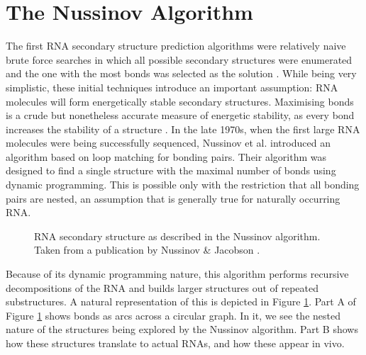 \documentclass[12pt, a4paper]{article}
\begin{document}
\section*{The Nussinov Algorithm} The first RNA secondary structure prediction algorithms were relatively naive brute force searches in which all possible secondary structures were enumerated and the one with
the most bonds was selected as the solution \cite{nussinov1978algorithms}. While being very simplistic,
these initial techniques introduce an important assumption: RNA molecules will
form energetically stable secondary structures. Maximising bonds is a crude but
nonetheless accurate measure of energetic stability, as every bond increases the
stability of a structure \cite{nussinov1978algorithms}. In the late 1970s, when the first large RNA molecules
were being successfully sequenced, Nussinov et al. \cite{nussinov1978algorithms} introduced an algorithm
based on loop matching for bonding pairs. Their algorithm was designed to find a
single structure with the maximal number of bonds using dynamic programming. This is possible only with the restriction that all bonding pairs are nested, an assumption that is generally true for naturally occurring RNA.

\begin{figure}
\begin{center}
\end{center}
\caption{RNA secondary structure as described in the Nussinov algorithm.
Taken from a publication by Nussinov \& Jacobson \cite{nussinov1980fast}.}
\label{figure1}
\end{figure}


Because of its dynamic programming nature, this algorithm performs recursive decompositions of the RNA and builds
larger structures out of repeated substructures. A natural representation of this is
depicted in Figure \ref{figure1}. Part A of Figure \ref{figure1} shows bonds as arcs across a circular
graph. In it, we see the nested nature of the structures being explored by the
Nussinov algorithm. Part B shows how these structures translate to actual RNAs,
and how these appear in vivo.
\end{document}
